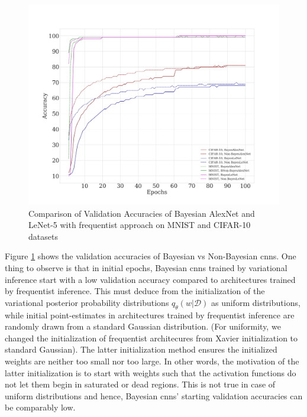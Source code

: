 \begin{figure}[t!] 
\begin{center}
\includegraphics[width=\linewidth]{Chapter5/Figs/results_mnist_CIFAR10.png}
\caption{Comparison of Validation Accuracies of Bayesian AlexNet and LeNet-5 with frequentist approach on MNIST and CIFAR-10 datasets}
\label{fig:MnistCIFAR10reesults}
\end{center}
\end{figure} 

\newline Figure \ref{fig:MnistCIFAR10reesults} shows the validation accuracies of Bayesian vs Non-Bayesian \acp{cnn}. One thing to observe is that in initial epochs, Bayesian \acp{cnn} trained by variational inference start with a low validation accuracy compared to architectures trained by frequentist inference. This must deduce from the initialization of the variational posterior probability distributions $q_{\theta}(w|\mathcal{D})$ as uniform distributions, while initial point-estimates in architectures trained by frequentist inference are randomly drawn from a standard Gaussian distribution. (For uniformity, we changed the initialization of frequentist architecures from Xavier initialization to standard Gaussian). The latter initialization method ensures the initialized weights are neither too small nor too large. In other words, the motivation of the latter initialization is to start with weights such that the activation functions do not let them begin in saturated or dead regions. This is not true in case of uniform distributions and hence, Bayesian \acp{cnn}' starting validation accuracies can be comparably low.

